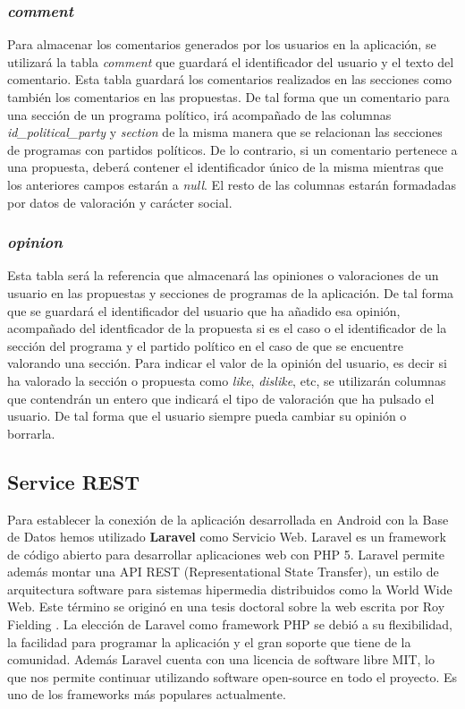 \subsubsection{\textit{comment}}

Para almacenar los comentarios generados por los usuarios en la aplicación, se utilizará la tabla \textit{comment} que guardará el identificador del usuario y el texto del comentario. Esta tabla guardará los comentarios realizados en las secciones como también los comentarios en las propuestas. De tal forma que un comentario para una sección de un programa político, irá acompañado de las columnas \textit{id\_political\_party} y \textit{section} de la misma manera que se relacionan las secciones de programas con partidos políticos. De lo contrario, si un comentario pertenece a una propuesta, deberá contener el identificador único de la misma mientras que los anteriores campos estarán a \textit{null}. El resto de las columnas estarán formadadas por datos de valoración y carácter social.

\subsubsection{\textit{opinion}}

Esta tabla será la referencia que almacenará las opiniones o valoraciones de un usuario en las propuestas y secciones de programas de la aplicación. De tal forma que se guardará el identificador del usuario que ha añadido esa opinión, acompañado del identficador de la propuesta si es el caso o el identificador de la sección del programa y el partido político en el caso de que se encuentre valorando una sección. Para indicar el valor de la opinión del usuario, es decir si ha valorado la sección o propuesta como \textit{like}, \textit{dislike}, etc, se utilizarán columnas que contendrán un entero que indicará el tipo de valoración que ha pulsado el usuario. De tal forma que el usuario siempre pueda cambiar su opinión o borrarla.

\subsection{Service REST} \label{ssec:seviceREST}

Para establecer la conexión de la aplicación desarrollada en Android con la Base de Datos hemos utilizado \textbf{Laravel} como Servicio Web. Laravel \cite{ref:laravel} es un framework de código abierto para desarrollar aplicaciones web con PHP 5. Laravel permite además montar una API REST (Representational State Transfer), un estilo de arquitectura software para sistemas hipermedia distribuidos como la World Wide Web. Este término se originó en una tesis doctoral sobre la web escrita por Roy Fielding \cite{ref:RESTPhd}. La elección de Laravel como framework PHP se debió a su flexibilidad, la facilidad para programar la aplicación y el gran soporte que tiene de la comunidad. Además Laravel cuenta con una licencia de software libre MIT, lo que nos permite continuar utilizando software open-source en todo el proyecto. Es uno de los frameworks más populares actualmente.

